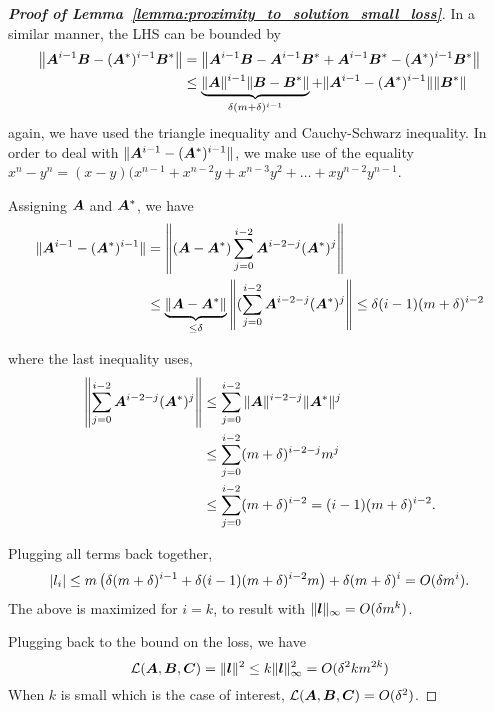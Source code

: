 \begin{proof}[\textbf{Proof of Lemma~\ref{lemma:proximity_to_solution_small_loss}}]
In a similar manner, the LHS can be bounded by
\begin{align}
    \left\|{\bm{A}}^{i-1}{\bm{B}}-({\bm{A}}^*)^{i-1}{\bm{B}}^*\right\|& =\left\|{\bm{A}}^{i-1}{\bm{B}}-{\bm{A}}^{i-1}{\bm{B}}^*+{\bm{A}}^{i-1}{\bm{B}}^*-({\bm{A}}^*)^{i-1}{\bm{B}}^*\right\|\\
    & \le \underbrace{\|{\bm{A}}\|^{i-1}\|{\bm{B}}-{\bm{B}}^*\|}_{\delta (m+\delta)^{i-1}}+\|{\bm{A}}^{i-1}-({\bm{A}}^*)^{i-1}\|\|{\bm{B}}^*\|
\end{align}
again, we have used the triangle inequality and Cauchy-Schwarz inequality. In order to deal with $\|{\bm{A}}^{i-1}-({\bm{A}}^*)^{i-1}\|$, we make use of the equality $x^n-y^n=(x-y)(x^{n-1}+x^{n-2}y+x^{n-3}y^2+\dots+xy^{n-2} y^{n-1}$.

Assigning ${\bm{A}}$ and ${\bm{A}}^*$, we have
\begin{align}
    \|{\bm{A}}^{i-1}-({\bm{A}}^*)^{i-1}\| & =\left\|({\bm{A}}-{\bm{A}}^*)\sum_{j=0}^{i-2}{\bm{A}}^{i-2-j}({\bm{A}}^*)^j\right\|\\
    & \le \underbrace{\| {\bm{A}}-{\bm{A}}^*\|}_{\le \delta}\left\|(\sum_{j=0}^{i-2}{\bm{A}}^{i-2-j}({\bm{A}}^*)^j\right\|\le \delta (i-1)(m+\delta)^{i-2}
\end{align}

where the last inequality uses,
\begin{align}
    \left\|\sum_{j=0}^{i-2}{\bm{A}}^{i-2-j}({\bm{A}}^*)^j\right\| & \le\sum_{j=0}^{i-2}\|{\bm{A}}\|^{i-2-j}\|{\bm{A}}^*\|^j \\ 
    & \le\sum_{j=0}^{i-2}(m+\delta)^{i-2-j}m^j\\
    & \le\sum_{j=0}^{i-2}(m+\delta)^{i-2}=(i-1)(m+\delta)^{i-2}.
\end{align}

Plugging all terms back together,
\begin{equation}
    |{l}_i|\le m \left( \delta(m+\delta)^{i-1} +\delta (i-1)(m+\delta)^{i-2}m \right) + \delta(m+\delta)^i=O(\delta m^i).
\end{equation}
The above is maximized for $i=k$, to result with $\|{\bm{l}}\|_{\infty}=O(\delta m^k)$.

Plugging back to the bound on the loss, we have
\begin{equation}
    \mathcal{L}({\bm{A}},{\bm{B}},{\bm{C}})=\|{\bm{l}}\|^2\le k \|{\bm{l}}\|_{\infty}^2=O(\delta^2 k m^{2k})
\end{equation}
When $k$ is small which is the case of interest, $\mathcal{L}({\bm{A}},{\bm{B}},{\bm{C}})=O(\delta^2)$.





\end{proof}

